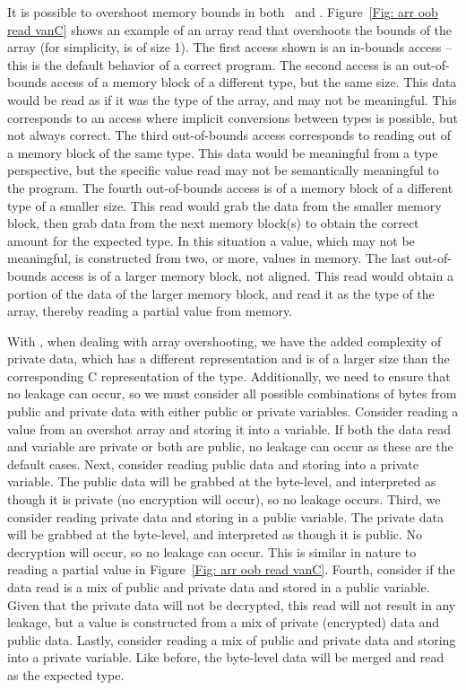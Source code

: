 
It is possible to overshoot memory bounds in both \vanillaC\ and \piccoC. 
Figure~\ref{Fig: arr oob read vanC} shows an example of an array read that overshoots the bounds of the array  (for simplicity,  is of size 1).  
The first access shown  is an in-bounds access -- this is the default behavior of a  correct
program.  The second access is an out-of-bounds access of a memory block of a different type, but the same size. This data would be read as if it was the type of the array, and may not be meaningful.  This corresponds to an access where implicit conversions between types is possible, but not always correct.
The third out-of-bounds access corresponds to reading out of a memory block of the same type. This data would be meaningful from a type perspective, but the specific value read may not be semantically meaningful to the program. 
 The fourth out-of-bounds access is of a memory block of a different type of a smaller size. This read would grab the data from the smaller memory block, then grab data from the next memory block(s) to obtain the correct amount for the expected type.  In this situation a value, which may not be meaningful, is constructed from two, or more, values in memory.
 The last out-of-bounds access is of a larger memory block, not aligned. This read would obtain a portion of the data of the larger memory block, and read it as the type of the array, thereby reading a partial value from memory.

With \piccoC, when dealing with array overshooting, we have the added complexity of private data, which has a different representation and is of a larger size than the corresponding C representation of the type. 
Additionally, we need to ensure that no leakage can occur, so we must consider all possible combinations of bytes from public and private data with either public or private variables. 
Consider reading a value from an overshot array and storing it into a variable. If both the data read and variable are private or both are public, no leakage can occur as these are the default cases.
Next, consider reading public data and storing into a private variable. The public data will be grabbed at the byte-level, and interpreted as though it is private (no encryption will occur), so no leakage occurs.
Third, we consider reading private data and storing in a public variable. The private data will be grabbed at the byte-level, and interpreted as though it is public. No decryption will occur, so no leakage can occur. This is similar in nature to reading a partial value in Figure~\ref{Fig: arr oob read vanC}. 
Fourth, consider if the data read is a mix of public and private data and stored in a public variable. Given that the private data will not be decrypted, this read will not result in any leakage, but a value is constructed from a mix
of private (encrypted) data and public data. 
Lastly, consider reading a mix of public and private data and storing into a private variable. Like before, the byte-level data will be merged and read as the expected type. 


